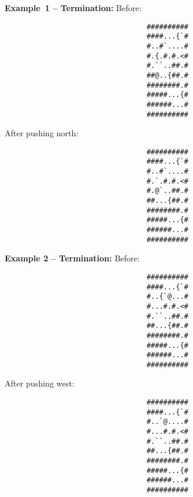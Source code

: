 \begin{MyGreenBox}
{	\textbf{Example 1 – Termination:} Before: \begin{verbatim}
                                  ##########
                                  ####...{`#
                                  #..#`....#
                                  #.{.#.#.<#
                                  #.``..##.#
                                  ##@..{##.#
                                  ########.#
                                  #####...{#
                                  ######...#
                                  ##########
\end{verbatim}

	After pushing north:

	\begin{verbatim}
                                  ##########
                                  ####...{`#
                                  #..#`....#
                                  #.`.#.#.<#
                                  #.@`..##.#
                                  ##...{##.#
                                  ########.#
                                  #####...{#
                                  ######...#
                                  ##########
\end{verbatim}

	\textbf{Example 2 – Termination:} Before:

	\begin{verbatim}
                                  ##########
                                  ####...{`#
                                  #..{`@...#
                                  #...#.#.<#
                                  #.``..##.#
                                  ##...{##.#
                                  ########.#
                                  #####...{#
                                  ######...#
                                  ##########
\end{verbatim}

	After pushing west:

	\begin{verbatim}
                                  ##########
                                  ####...{`#
                                  #..`@....#
                                  #...#.#.<#
                                  #.``..##.#
                                  ##...{##.#
                                  ########.#
                                  #####...{#
                                  ######...#
                                  ##########
\end{verbatim}

}
\end{MyGreenBox}
